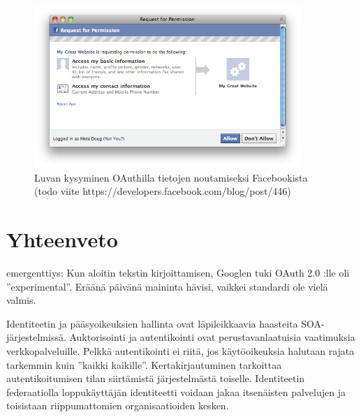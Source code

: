 \documentclass[finnish,gradu]{tktltiki}
\begin{document}
  \begin{figure}
    \centering
    \includegraphics[width=0.9\textwidth]{images/facebook_authorization_contact_info.png}
    \caption{Luvan kysyminen OAuthilla tietojen noutamiseksi Facebookista (todo viite https://developers.facebook.com/blog/post/446)}
    \label{fig:luvan_kysyminen_oauth_fb}
  \end{figure}









\section{Yhteenveto} %
\label{sec:yhteenveto}

  emergenttiys: Kun aloitin tekstin kirjoittamisen, Googlen tuki OAuth 2.0 :lle oli ''experimental''. Eräänä päivänä maininta hävisi, vaikkei standardi ole vielä valmis. %

  Identiteetin ja pääsyoikeuksien hallinta ovat läpileikkaavia haasteita SOA-järjestelmissä.
  Auktorisointi ja autentikointi ovat perustavanlaatuisia vaatimuksia verkkopalveluille. Pelkkä autentikointi ei riitä, jos käytöoikeuksia halutaan rajata tarkemmin kuin ''kaikki kaikille''. Kertakirjautuminen tarkoittaa autentikoitumisen tilan siirtämistä järjestelmästä toiselle. Identiteetin federaatiolla loppukäyttäjän identiteetti voidaan jakaa itsenäisten palvelujen ja toisistaan riippumattomien organisaatioiden kesken.
\end{document}
